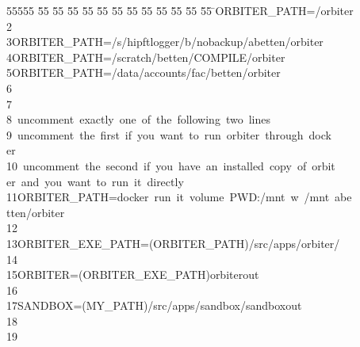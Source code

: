 %
%
\begin{tabbing}
55555 \= 55 \= 55 \= 55 \= 55 \= 55 \= 55 \= 55 \= 55 \= 55 \= 55 \= 55 \= 55 \= \>ORBITER\_PATH=/orbiter\\[0pt]
2\>\\[0pt]
3\>ORBITER\_PATH=/s/hipftlogger/b/nobackup/abetten/orbiter\\[0pt]
4\>ORBITER\_PATH=/scratch/betten/COMPILE/orbiter\\[0pt]
5\>ORBITER\_PATH=/data/accounts/fac/betten/orbiter\\[0pt]
6\>\\[0pt]
7\>\\[0pt]
8\>\ uncomment\ exactly\ one\ of\ the\ following\ two\ lines\\[0pt]
9\>\ uncomment\ the\ first\ if\ you\ want\ to\ run\ orbiter\ through\ dock\\[0pt]
\>er\\[0pt]
10\>\ uncomment\ the\ second\ if\ you\ have\ an\ installed\ copy\ of\ orbit\\[0pt]
\>er\ and\ you\ want\ to\ run\ it\ directly\ \\[0pt]
11\>ORBITER\_PATH=docker\ run\ it\ volume\ PWD:/mnt\ w\ /mnt\ abe\\[0pt]
\>tten/orbiter\ \\[0pt]
12\>\\[0pt]
13\>ORBITER\_EXE\_PATH=(ORBITER\_PATH)/src/apps/orbiter/\\[0pt]
14\>\\[0pt]
15\>ORBITER=(ORBITER\_EXE\_PATH)orbiterout\\[0pt]
16\>\\[0pt]
17\>SANDBOX=(MY\_PATH)/src/apps/sandbox/sandboxout\\[0pt]
18\>\\[0pt]
19\>\\[0pt]

\end{tabbing}
